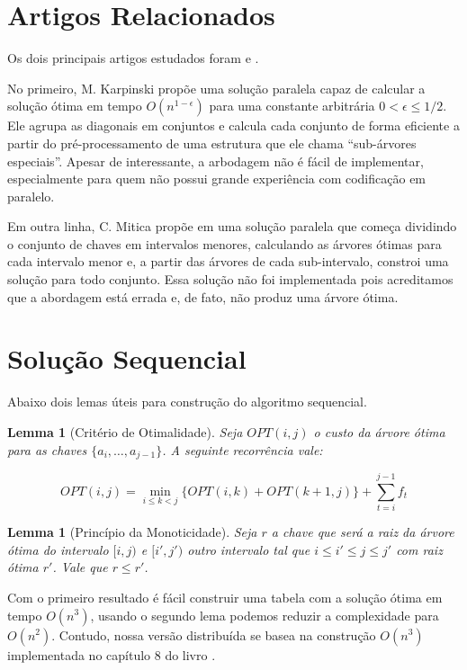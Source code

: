 \documentclass[12pt]{article}
\newtheorem{lem}[thm]{Lemma}
\begin{document}
\section{Artigos Relacionados}

Os dois principais artigos estudados foram \cite{karpinski94} e \cite{mitica}.

No primeiro, M. Karpinski propõe uma solução paralela capaz
de calcular a solução ótima em tempo $O(n^{1-\epsilon})$ para uma
constante arbitrária $0 < \epsilon \le 1/2$. Ele agrupa as diagonais
em conjuntos e calcula cada conjunto de forma eficiente a partir 
do pré-processamento de uma estrutura que ele chama ``sub-árvores especiais''. 
Apesar de interessante, a arbodagem não é fácil de implementar, 
especialmente para quem não possui grande experiência com codificação
em paralelo.

Em outra linha, C. Mitica propõe em \cite{mitica} uma solução paralela
que começa dividindo o conjunto de chaves em intervalos menores,
calculando as árvores ótimas para cada intervalo menor e, a partir
das árvores de cada sub-intervalo, constroi uma solução para todo 
conjunto. Essa solução não foi implementada pois acreditamos que
a abordagem está errada e, de fato, não produz uma árvore ótima.  


\section{Solução Sequencial}

Abaixo dois lemas úteis para construção do algoritmo
sequencial.

\begin{lem}[Critério de Otimalidade]
Seja $OPT(i, j)$ o custo da árvore ótima para as chaves $\{a_i, \ldots, a_{j-1}\}$.
A seguinte recorrência vale:

$$OPT(i, j) = \min_{i \le k < j} \{OPT(i, k) + OPT(k+1, j)\} + \sum_{t=i}^{j-1} f_t$$

\end{lem}

\begin{lem}[Princípio da Monoticidade]
	Seja $r$ a chave que será a raiz da árvore ótima do
	intervalo $[i, j)$ e $[i', j')$ outro intervalo tal que
	$i \le i' \le j \le j'$ com raiz ótima $r'$. Vale
	que $r \le r'$. 
\end{lem}

Com o primeiro resultado é fácil construir uma tabela
com a solução ótima em tempo $O(n^3)$, usando o segundo lema podemos
reduzir a complexidade para $O(n^2)$. Contudo, nossa
versão distribuída se basea na construção $O(n^3)$ implementada
no capítulo 8 do livro \cite{quinn}.
\end{document}

